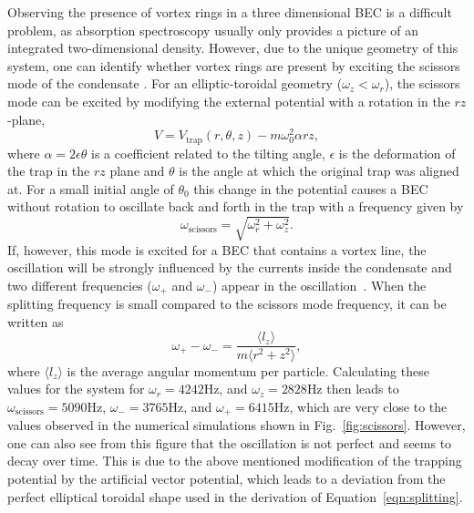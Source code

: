 Observing the presence of vortex rings in a three dimensional BEC is a difficult problem, as absorption spectroscopy usually only provides a picture of an integrated two-dimensional density.
However, due to the unique geometry of this system, one can identify whether vortex rings are present by exciting the scissors mode of the condensate \cite{cozzini2003, guery1999, marago2000}. 
For an elliptic-toroidal geometry ($\omega_z < \omega_r$), the scissors mode can be excited by modifying the external potential with a rotation in the $rz$-plane,
\begin{equation}
        V = V_{\text{trap}}(r, \theta, z) -m\omega_0^2\alpha rz,
\end{equation}
where $\alpha = 2\epsilon\theta$ is a coefficient related to the tilting angle, $\epsilon$ is the deformation of the trap in the $rz$ plane and $\theta$ is the angle at which the original trap was aligned at.
For a small initial angle of $\theta_0$ this change in the potential causes a BEC without rotation to oscillate back and forth in the trap with a frequency given by \cite{stringari2001}
\begin{equation}
        \omega_{\text{scissors}} = \sqrt{\omega_r^2+\omega_z^2}.
\end{equation}
If, however, this mode is excited for a BEC that contains a vortex line, the oscillation will be strongly influenced by the currents inside the condensate and two different frequencies ($\omega_+$ and $\omega_-$) appear in the oscillation~\cite{smith2004, zambelli1998, stringari2001}.
When the splitting frequency is small compared to the scissors mode frequency, it 
can be written as \cite{zambelli1998}
\begin{equation}
\omega_{+} - \omega_{-} = \frac{\langle l_z \rangle}{m\langle r^2 + z^2 \rangle},
\label{eqn:splitting}
\end{equation}
where $\langle l_z \rangle$ is the average angular momentum per particle.
Calculating these values for the system for $\omega_r = 4242$Hz, and $\omega_z = 2828$Hz then leads to $\omega_{\text{scissors}} = 5090$Hz, $\omega_{-} = 3765$Hz, and $\omega_{+} = 6415$Hz, which are very close to the values observed in the numerical simulations shown in Fig.~\ref{fig:scissors}.
However, one can also see from this figure that the oscillation is not perfect and seems to decay over time.
This is due to the above mentioned modification of the trapping potential by the artificial vector potential, which leads to a deviation from the perfect elliptical toroidal shape used in the derivation of Equation~\eqref{eqn:splitting}.

